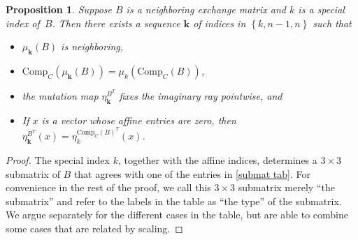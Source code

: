 \documentclass{amsart}
\newtheorem{proposition}{Proposition}[section]
\theoremstyle{definition}
\theoremstyle{remark}
\numberwithin{equation}{section}
\newcommand{\set}[1]{{\left\lbrace #1 \right\rbrace}}
\newcommand{\0}{{\mathbf{0}}}
\newcommand{\Comp}{\mathrm{Comp}_C}
\newcommand{\kk}{\mathbf{k}}
\begin{document}
\begin{proposition}\label{special mut}
Suppose $B$ is a neighboring exchange matrix and $k$ is a special index of~$B$.
Then there exists a sequence $\kk$ of indices in $\set{k,n-1,n}$ such that 
\begin{itemize}
\item
$\mu_\kk(B)$ is neighboring,
\item
$\Comp(\mu_\kk(B))=\mu_k(\Comp(B))$,
\item
the mutation map $\eta^{B^T}_\kk$ fixes the imaginary ray pointwise, and 
\item
If $x$ is a vector whose affine entries are zero, then $\eta^{B^T}_\kk(x)=\eta^{\Comp(B)^T}_k(x)$.
\end{itemize}
\end{proposition}
\begin{proof}
The special index $k$, together with the affine indices, determines a $3\times3$ submatrix of $B$ that agrees with one of the entries in \cref{submat tab}.
For convenience in the rest of the proof, we call this $3\times3$ submatrix merely ``the submatrix'' and refer to the labels in the table as ``the type'' of the submatrix.
We argue separately for the different cases in the table, but are able to combine some cases that are related by scaling.

\medskip


\end{proof}
\end{document}
